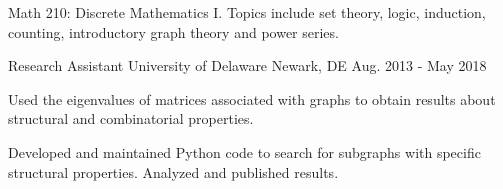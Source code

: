 \begin{cventries}
{\begin{cvitems}
        \item {Math 210: Discrete Mathematics I. Topics include set theory, logic, induction, counting, introductory graph theory and power series.}
      \end{cvitems}
    }
  \cventry
    {Research Assistant}
    {University of Delaware}
    {Newark, DE}
    {Aug. 2013 - May 2018}
    {
      \begin{cvitems}
        \item {Used the eigenvalues of matrices associated with graphs to obtain results about structural and combinatorial properties.}
        \item{Developed and maintained Python code to search for subgraphs with specific structural properties. Analyzed and published results.}
      \end{cvitems}
    }
\end{cventries}
\vspace*{-2pt}
